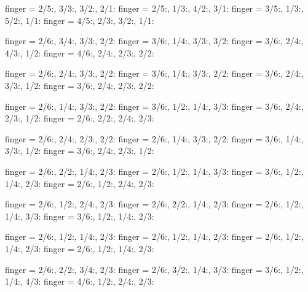 \documentclass[../main.tex]{subfiles}
\begin{document}
  {finger = {2/5:\R, 3/3:, 3/2:, 2/1:}}
  {finger = {2/5:, 1/3:\R, 4/2:, 3/1:}}
  {finger = {3/5:, 1/3:, 5/2:, 1/1:\R}}
  {finger = {4/5:, 2/3:, 3/2:\R, 1/1:}}



  {finger = {2/6:\R, 3/4:, 3/3:, 2/2:}}
  {finger = {3/6:, 1/4:\R, 3/3:, 3/2:}}
  {finger = {3/6:, 2/4:, 4/3:, 1/2:\R}}
  {finger = {4/6:, 2/4:, 2/3:\R, 2/2:}}

  {finger = {2/6:\R, 2/4:, 3/3:, 2/2:}}
  {finger = {3/6:, 1/4:\R, 3/3:, 2/2:}}
  {finger = {3/6:, 2/4:, 3/3:, 1/2:\R}}
  {finger = {3/6:, 2/4:, 2/3:\R, 2/2:}}

  {finger = {2/6:\R, 1/4:, 3/3:, 2/2:}}
  {finger = {3/6:, 1/2:, 1/4:\R, 3/3:}}
  {finger = {3/6:, 2/4:, 2/3:, 1/2:\R}}
  {finger = {2/6:, 2/2:, 2/4:, 2/3:\R}}

  {finger = {2/6:\R, 2/4:, 2/3:, 2/2:}}
  {finger = {2/6:, 1/4:\R, 3/3:, 2/2:}}
  {finger = {3/6:, 1/4:, 3/3:, 1/2:\R}}
  {finger = {3/6:, 2/4:, 2/3:\R, 1/2:}}


  {finger = {2/6:\R, 2/2:, 1/4:, 2/3:}}
  {finger = {2/6:, 1/2:, 1/4:\R, 3/3:}}
  {finger = {3/6:, 1/2:\R, 1/4:, 2/3:}}
  {finger = {2/6:, 1/2:, 2/4:, 2/3:\R}}

  {finger = {2/6:\R, 1/2:, 2/4:, 2/3:}}
  {finger = {2/6:, 2/2:, 1/4:\R, 2/3:}}
  {finger = {2/6:, 1/2:\R, 1/4:, 3/3:}}
  {finger = {3/6:, 1/2:, 1/4:, 2/3:\R}}


  {finger = {2/6:\R, 1/2:, 1/4:, 2/3:}}
  {finger = {2/6:, 1/2:, 1/4:\R, 2/3:}}
  {finger = {2/6:, 1/2:\R, 1/4:, 2/3:}}
  {finger = {2/6:, 1/2:, 1/4:, 2/3:\R}}

  {finger = {2/6:\R, 2/2:, 3/4:, 2/3:}}
  {finger = {2/6:, 3/2:, 1/4:\R, 3/3:}}
  {finger = {3/6:, 1/2:\R, 1/4:, 4/3:}}
  {finger = {4/6:, 1/2:, 2/4:, 2/3:\R}}
\end{document}
